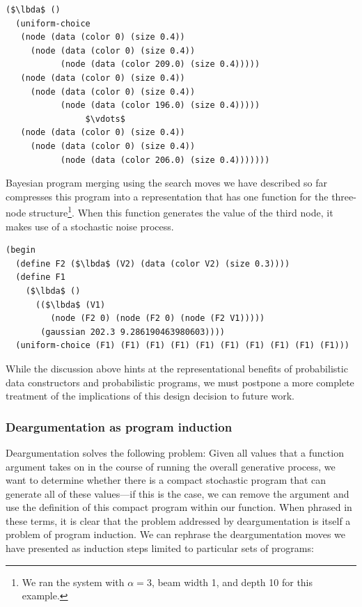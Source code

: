 \documentclass[a4paper,10pt]{article}
\newcommand{\lbda}{\color[rgb]{0,.3,.7} \lambda}
\begin{document}
\begin{lstlisting}[mathescape=true]
($\lbda$ ()
  (uniform-choice
   (node (data (color 0) (size 0.4))
	 (node (data (color 0) (size 0.4))
	       (node (data (color 209.0) (size 0.4)))))
   (node (data (color 0) (size 0.4))
	 (node (data (color 0) (size 0.4))
	       (node (data (color 196.0) (size 0.4)))))
                $\vdots$
   (node (data (color 0) (size 0.4))
	 (node (data (color 0) (size 0.4))
	       (node (data (color 206.0) (size 0.4)))))))
\end{lstlisting}

Bayesian program merging using the search moves we have described so far compresses this program into a representation that has one function for the three-node structure\footnote{We ran the system with $\alpha=3$, beam width 1, and depth 10 for this example.}. When this function generates the value of the third node, it makes use of a stochastic noise process. 

\begin{lstlisting}[mathescape=true]
(begin
  (define F2 ($\lbda$ (V2) (data (color V2) (size 0.3))))
  (define F1
    ($\lbda$ ()
      (($\lbda$ (V1)
         (node (F2 0) (node (F2 0) (node (F2 V1)))))
       (gaussian 202.3 9.286190463980603))))
  (uniform-choice (F1) (F1) (F1) (F1) (F1) (F1) (F1) (F1) (F1) (F1)))
\end{lstlisting}

While the discussion above hints at the representational benefits of probabilistic data constructors and probabilistic programs, we must postpone a more complete treatment of the implications of this design decision to future work.


\subsubsection{Deargumentation as program induction}
\label{sec:dearg-as-induction}

Deargumentation solves the following problem: Given all values that a function argument takes on in the course of running the overall generative process, we want to determine whether there is a compact stochastic program that can generate all of these values---if this is the case, we can remove the argument and use the definition of this compact program within our function. When phrased in these terms, it is clear that the problem addressed by deargumentation is itself a problem of program induction. We can rephrase the deargumentation moves we have presented as induction steps limited to particular sets of programs:
\end{document}
